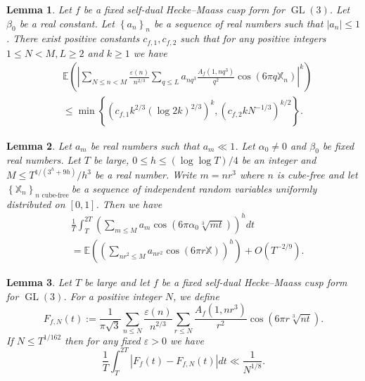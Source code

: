 \documentclass[10pt,a4paper]{amsart}
\newtheorem{lemma}{Lemma}
\begin{document}
\begin{lemma}\label{le6.1}
    Let $f$ be a fixed self-dual Hecke--Maass cusp form for $\operatorname{GL}(3)$. Let $\beta_0$ be a real constant. Let $\left\{a_n\right\}_n$ be a sequence of real numbers such that $\left|a_n\right| \leqslant 1$. There exist positive constants $c_{f,1}, c_{f,2}$ such that for any positive integers $1 \leqslant N<M, L \geqslant 2$ and $k \geqslant 1$ we have
    \begin{equation}\label{eq6.1}
    \begin{aligned}
        & \mathbb{E}\left(\left|\sum_{N \leqslant n<M} \frac{\varepsilon(n)}{n^{2 / 3}} \sum_{q \leqslant L} a_{n q^3} \frac{A_f\left(1,n q^3\right)}{q^{2}} \cos \left(6 \pi q \mathbb{X}_n\right)\right|^k\right) \\
        & \leqslant \min \left\{\left(c_{f,1} k^{2 / 3}\left(\log 2k\right)^{2/3}\right)^k,\left(c_{f,2} kN^{-1/3}\right)^{k / 2}\right\}.
    \end{aligned}
    \end{equation}
\end{lemma} 

\begin{lemma}\label{le6.3}
     Let $a_m$ be real numbers such that $a_m \ll 1$. Let $\alpha_0 \neq 0$ and $\beta_0$ be fixed real numbers. Let $T$ be large, $0 \leqslant h \leqslant(\log \log T) / 4$ be an integer and $M \leqslant T^{1 /\left(3^h+9 h\right)} / h^3$ be a real number. Write $m=n r^3$ where $n$ is cube-free and let $\left\{\mathbb{X}_n\right\}_{n \text { cube-free  }}$be a sequence of independent random variables uniformly distributed on $[0,1]$. Then we have
     \[
     \begin{aligned}
     &\frac{1}{T} \int_T^{2 T}\left(\sum_{m \leqslant M} a_m \cos \left(6 \pi \alpha_0 \sqrt[3]{m t}\right)\right)^h d t\\
     &=  \mathbb{E}\left(\left(\sum_{n r^2 \leqslant M} a_{n r^2} \cos \left(6 \pi r \mathbb{X}\right)\right)^h\right) +O\left(T^{- 2/ 9}\right).
     \end{aligned}
     \]
\end{lemma}

\begin{lemma}\label{le6.4}
    Let $T$ be large and let $f$ be a fixed self-dual Hecke--Maass cusp form for $\operatorname{GL}(3)$. For a positive integer $N$, we define
\[
F_{f,N}(t):=\frac{1}{\pi \sqrt{3}} \sum_{n \leqslant N} \frac{\varepsilon(n)}{n^{2/3}} \sum_{r \leqslant N} \frac{A_f\left(1,n r^3\right)}{r^{ 2}} \cos \left(6 \pi r \sqrt[3]{n t}\right).
\]
If $N \leqslant T^{1 /162}$ then for any fixed $\varepsilon>0$ we have
\[
\frac{1}{T} \int_T^{2 T}\left|F_f(t)-F_{f,N}(t)\right| d t \ll \frac{1}{N^{1 / 8}}.
\]
\end{lemma}
\end{document}
